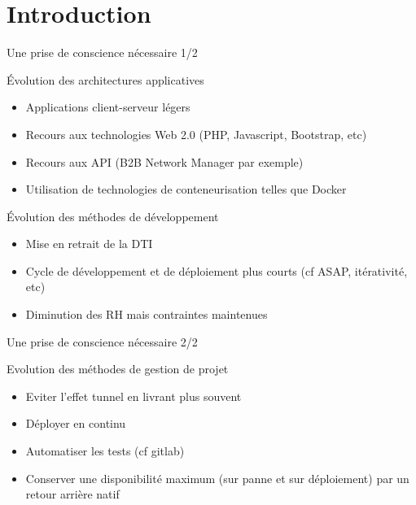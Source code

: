 \section{Introduction}

\begin{frame}{Une prise de conscience nécessaire 1/2}
\begin{block}{Évolution des architectures applicatives}
\begin{itemize}
\item Applications client-serveur légers \pause
\item Recours aux technologies Web 2.0 (PHP, Javascript, Bootstrap, etc) \pause
\item Recours aux API (B2B Network Manager par exemple) \pause
\item Utilisation de technologies de conteneurisation telles que Docker \pause
\end{itemize}
\end{block}
\begin{block}{Évolution des méthodes de développement}
\begin{itemize}
\item Mise en retrait de la DTI \pause
\item Cycle de développement et de déploiement plus courts (cf ASAP, itérativité, etc) \pause
\item Diminution des RH mais contraintes maintenues \pause
\end{itemize}
\end{block}
\end{frame}

\begin{frame}{Une prise de conscience nécessaire 2/2}
\begin{block}{Evolution des méthodes de gestion de projet}
\begin{itemize}
\item Eviter l'effet tunnel en livrant plus souvent \pause
\item Déployer en continu \pause
\item Automatiser les tests (cf gitlab) \pause
\item Conserver une disponibilité maximum (sur panne et sur déploiement) par un retour arrière natif \pause
\end{itemize}
\end{block}
\end{frame}

